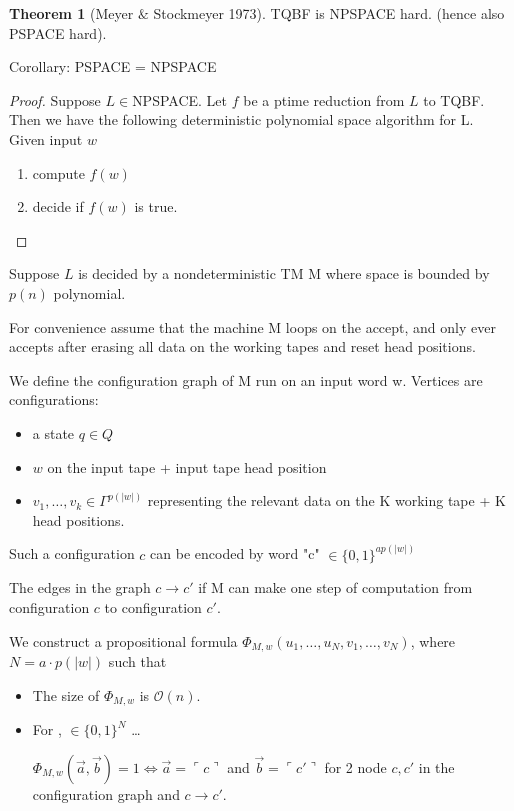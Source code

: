 \documentclass[a4paper,12pt]{article}
\theoremstyle{definition}
\newtheorem{theorem}[counter]{Theorem}
\theoremstyle{remark}
\begin{document}
\begin{theorem}[Meyer $\&$ Stockmeyer 1973]
    TQBF is NPSPACE hard. (hence also PSPACE hard).
\end{theorem}
Corollary: PSPACE = NPSPACE
\begin{proof}
    Suppose $L \in $NPSPACE. Let $f$ be a ptime reduction from $L$ to TQBF. Then we have the following deterministic polynomial space algorithm
    for L. Given input $w$
    \begin{enumerate}
        \item compute $f(w)$
        \item decide if $f(w)$ is true.
    \end{enumerate}
\end{proof}

Suppose $L$ is decided by a nondeterministic TM M where space is bounded by $p(n)$ polynomial.

For convenience assume that the machine M loops on the accept, and only ever accepts after erasing all data on the working tapes and reset head positions.

We define the configuration graph of M run on an input word w. Vertices are configurations:
\begin{itemize}
    \item a state $q \in Q$
    \item $w$ on the input tape + input tape head position
    \item $v_1, \dots, v_k \in \Gamma^{p(|w|)}$ representing the relevant data on the K working tape + K head positions. 
\end{itemize}

Such a configuration $c$ can be encoded by word "c" $\in \{0, 1\}^{a p(|w|)}$

The edges in the graph $c \to c'$ if M can make one step of computation from configuration $c$ to configuration $c'$.

We construct a propositional formula $\Phi_{M, w}(u_1, \dots, u_N, v_1, \dots, v_N)$, where $N = a \cdot p(|w|)$ such that
\begin{itemize}
    \item The size of $\Phi_{M, w}$ is $\mathscr{O}(n)$.
    \item For ,  $\in \{0, 1\}^N$ \dots
    
    $\Phi_{M, w}(\overrightarrow{a}, \overrightarrow{b}) = 1 \iff \overrightarrow{a} = \ulcorner c \urcorner$ and $\overrightarrow{b} = \ulcorner c' \urcorner$ for 2 node $c, c'$ in the configuration graph and $c \to c'$.
\end{itemize}
\end{document}
